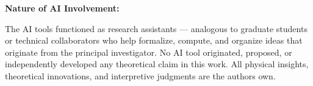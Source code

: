 \documentclass[
  10pt,
]{article}
\begin{document}
\textbf{Nature of AI Involvement:}

The AI tools functioned as research assistants --- analogous to graduate
students or technical collaborators who help formalize, compute, and
organize ideas that originate from the principal investigator. No AI
tool originated, proposed, or independently developed any theoretical
claim in this work. All physical insights, theoretical innovations, and
interpretive judgments are the author\textquotesingle s own.
\end{document}
